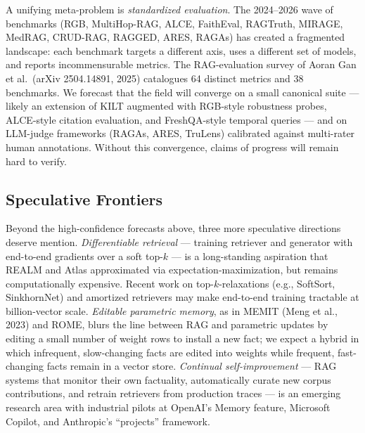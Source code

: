 \documentclass{article}
\begin{document}
A unifying meta-problem is \emph{standardized evaluation}. The 2024--2026 wave of benchmarks (RGB, MultiHop-RAG, ALCE, FaithEval, RAGTruth, MIRAGE, MedRAG, CRUD-RAG, RAGGED, ARES, RAGAs) has created a fragmented landscape: each benchmark targets a different axis, uses a different set of models, and reports incommensurable metrics. The RAG-evaluation survey of Aoran Gan et al.~(arXiv 2504.14891, 2025) catalogues 64 distinct metrics and 38 benchmarks. We forecast that the field will converge on a small canonical suite --- likely an extension of KILT augmented with RGB-style robustness probes, ALCE-style citation evaluation, and FreshQA-style temporal queries --- and on LLM-judge frameworks (RAGAs, ARES, TruLens) calibrated against multi-rater human annotations. Without this convergence, claims of progress will remain hard to verify.

\subsection{Speculative Frontiers}\label{speculative-frontiers}

Beyond the high-confidence forecasts above, three more speculative directions deserve mention. \emph{Differentiable retrieval} --- training retriever and generator with end-to-end gradients over a soft top-\(k\) --- is a long-standing aspiration that REALM and Atlas approximated via expectation-maximization, but remains computationally expensive. Recent work on top-\(k\)-relaxations (e.g., SoftSort, SinkhornNet) and amortized retrievers may make end-to-end training tractable at billion-vector scale. \emph{Editable parametric memory}, as in MEMIT (Meng et al., 2023) and ROME, blurs the line between RAG and parametric updates by editing a small number of weight rows to install a new fact; we expect a hybrid in which infrequent, slow-changing facts are edited into weights while frequent, fast-changing facts remain in a vector store. \emph{Continual self-improvement} --- RAG systems that monitor their own factuality, automatically curate new corpus contributions, and retrain retrievers from production traces --- is an emerging research area with industrial pilots at OpenAI's Memory feature, Microsoft Copilot, and Anthropic's ``projects'' framework.
\end{document}
